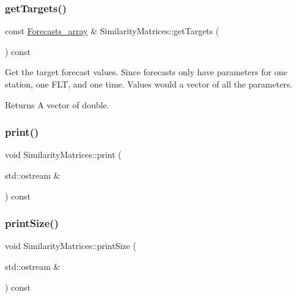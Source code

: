 \mbox{\label{class_similarity_matrices_a17f864e7a279029be249e5f0d3abb9e6}} 
\subsubsection{\texorpdfstring{get\+Targets()}{getTargets()}}
{\footnotesize\ttfamily const \mbox{\hyperlink{class_forecasts__array}{Forecasts\+\_\+array}} \& Similarity\+Matrices\+::get\+Targets (\begin{DoxyParamCaption}{ }\end{DoxyParamCaption}) const}

Get the target forecast values. Since forecasts only have parameters for one station, one F\+LT, and one time. Values would a vector of all the parameters.

\begin{DoxyReturn}{Returns}
A vector of double. 
\end{DoxyReturn}
\mbox{\label{class_similarity_matrices_a4c179c4c5ea3bb2f187ea5e26b4b853b}} 
\subsubsection{\texorpdfstring{print()}{print()}}
{\footnotesize\ttfamily void Similarity\+Matrices\+::print (\begin{DoxyParamCaption}\item[{std\+::ostream \&}]{ }\end{DoxyParamCaption}) const}

\mbox{\label{class_similarity_matrices_a7ab85a46c3d93d519b6ea89a4856938a}} 
\subsubsection{\texorpdfstring{print\+Size()}{printSize()}}
{\footnotesize\ttfamily void Similarity\+Matrices\+::print\+Size (\begin{DoxyParamCaption}\item[{std\+::ostream \&}]{ }\end{DoxyParamCaption}) const}

